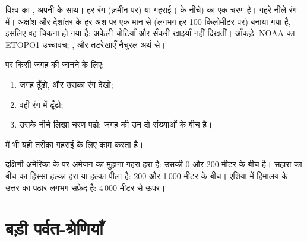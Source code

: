 \begin{omfigure}
{\small विश्व का , अपनी  के साथ। हर रंग  (ज़मीन
पर) या गहराई ( के नीचे) का एक चरण है।  गहरे नीले रंग में। 
अक्षांश और देशांतर के हर अंश पर एक मान से (लगभग हर 100 किलोमीटर पर) बनाया गया
है, इसलिए वह चिकना हो गया है: अकेली चोटियाँ और सँकरी खाइयाँ नहीं दिखतीं। आँकड़े:
NOAA का ETOPO1 उच्चावच; ,  और तटरेखाएँ
नैचुरल अर्थ से।}
\label{fig:g4:world-physical-map:map}
\end{omfigure}

\begin{method}[भौतिक मानचित्र पर एक रंग पढ़ना]\label{met:g4:world-physical-map:reading}
 पर किसी जगह की  जानने के लिए:
\begin{enumerate}
  \item जगह ढूँढो, और उसका रंग देखो;
  \item वही रंग  में ढूँढो;
  \item उसके नीचे लिखा चरण पढ़ो: जगह की  उन दो संख्याओं के
        बीच है।
\end{enumerate}
 में भी यही तरीक़ा गहराई के लिए काम करता है।
\end{method}

\begin{example}[तीन जगहें]\label{ex:g4:world-physical-map:three}
दक्षिणी अमेरिका के  पर अमेज़न का मुहाना गहरा हरा है: उसकी  0 और 200
मीटर के बीच है। सहारा का बीच का हिस्सा हल्का हरा या हल्का पीला है: 200 और
1\,000 मीटर के बीच। एशिया में हिमालय के उत्तर का पठार लगभग सफ़ेद है: 4\,000
मीटर से ऊपर।
\end{example}

\section{बड़ी पर्वत-श्रेणियाँ}

